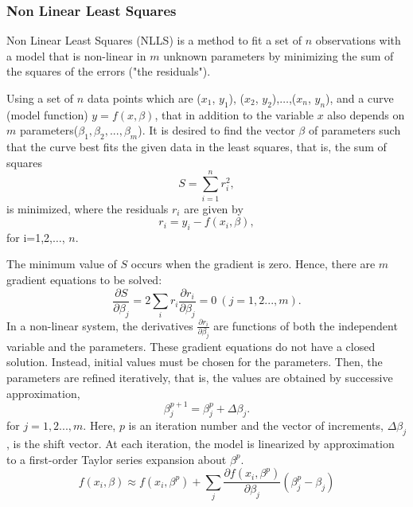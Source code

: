 \documentclass[journal]{IEEEtran}
\begin{document}
\subsubsection{\textbf{Non Linear Least Squares}}
\par Non Linear Least Squares (NLLS) is a method to fit a set of $n$ observations with a model that is non-linear in $m$ unknown parameters by minimizing the sum of the squares of the errors ("the residuals").
\par
Using a set of $n$ data points which are ($x_1$, $y_1$), ($x_2$, $y_2$),$\dots$,($x_n$, $y_n$), and a curve (model function) $y= f(x, \beta)$, that in addition to the variable $x$ also depends on $m$ parameters($\beta_1,\beta_2,...,\beta_m$).
It is desired to find the vector $\beta$ of parameters such that the curve best fits the given data in the least squares, that is, the sum of squares
\begin{equation}
    S=\sum_{i=1}^{n}r_i^2 ,
\end{equation}
is minimized, where the residuals $r_i$ are given by
\begin{equation}
    r_i = y_i - f(x_i,\beta),
\end{equation}
for i=1,2,$\dots$, $n$.
\par
The minimum value of $S$ occurs when the gradient is zero. Hence, there are $m$ gradient equations to be solved:
\begin{equation}
    \frac{\partial S}{\partial \beta_j}=2\sum_i r_i\frac{\partial r_i}{\partial \beta_j}=0 \ (j=1,2...,m).
\end{equation}
In a non-linear system, the derivatives $\frac{\partial r_i}{\partial \beta_j}$ are functions of both the independent
variable and the parameters. These gradient equations do not have a closed solution. Instead, initial values must be chosen for the
parameters. Then, the parameters are refined iteratively, that is, the values are obtained by successive approximation,
\begin{equation}
    \beta_j^{p+1}=\beta^p_j+\Delta \beta_j.
\end{equation}
for $j=1,2...,m.$ Here, $p$ is an iteration number and the vector of increments, $\Delta \beta_j$, is the shift vector. At each iteration, the model is linearized by approximation to a first-order Taylor series expansion about $\beta^p$.
\begin{equation}
    f(x_i,\beta)\approx f(x_i,\beta^p) +\sum_j \frac{\partial f(x_i, \beta^p)}{\partial \beta_j} \left(\beta^p_j -\beta_j \right)
\end{equation}
\end{document}
